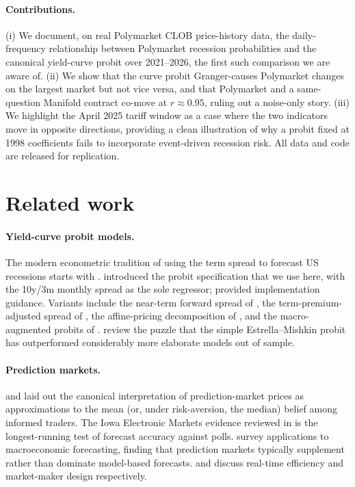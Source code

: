 \documentclass{article}
\begin{document}
\paragraph{Contributions.}
(i) We document, on real Polymarket CLOB price-history data, the daily-frequency relationship between Polymarket recession probabilities and the canonical yield-curve probit over 2021--2026, the first such comparison we are aware of. (ii) We show that the curve probit Granger-causes Polymarket changes on the largest market but not vice versa, and that Polymarket and a same-question Manifold contract co-move at $r\approx 0.95$, ruling out a noise-only story. (iii) We highlight the April 2025 tariff window as a case where the two indicators move in opposite directions, providing a clean illustration of why a probit fixed at 1998 coefficients fails to incorporate event-driven recession risk. All data and code are released for replication.

\section{Related work}

\paragraph{Yield-curve probit models.}
The modern econometric tradition of using the term spread to forecast US recessions starts with \citet{estrella1991term}. \citet{estrella1998predicting} introduced the probit specification that we use here, with the 10y/3m monthly spread as the sole regressor; \citet{estrella2006yieldcurve} provided implementation guidance. Variants include the near-term forward spread of \citet{engstrom2019near}, the term-premium-adjusted spread of \citet{bauer2018information}, the affine-pricing decomposition of \citet{adrian2013pricing}, and the macro-augmented probits of \citet{liu2016what}. \citet{rudebusch2009forecasting} review the puzzle that the simple Estrella--Mishkin probit has outperformed considerably more elaborate models out of sample.

\paragraph{Prediction markets.}
\citet{wolfers2004prediction} and \citet{manski2006interpreting} laid out the canonical interpretation of prediction-market prices as approximations to the mean (or, under risk-aversion, the median) belief among informed traders. The Iowa Electronic Markets evidence reviewed in \citet{berg2008results} is the longest-running test of forecast accuracy against polls. \citet{snowberg2013prediction} survey applications to macroeconomic forecasting, finding that prediction markets typically supplement rather than dominate model-based forecasts. \citet{croxson2014information} and \citet{othman2013gates} discuss real-time efficiency and market-maker design respectively.
\end{document}

